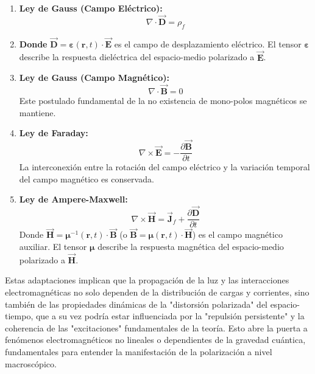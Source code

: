 \documentclass{book}
\newcommand{\bvec}[1]{\vec{\mathbf{#1}}}
\begin{document}
\begin{enumerate}
    \item \textbf{Ley de Gauss (Campo Eléctrico):}
    \begin{equation}
       \nabla \cdot \bvec{D} = \rho_f
        \label{eq:maxwell_gauss_E}
    \end{equation}
    \item \textbf{Donde} $\bvec{D} = \boldsymbol{\varepsilon}(\mathbf{r}, t) \cdot \bvec{E}$ es el campo de desplazamiento eléctrico. El tensor $\boldsymbol{\varepsilon}$ describe la respuesta dieléctrica del espacio-medio polarizado a $\bvec{E}$.

    \item \textbf{Ley de Gauss (Campo Magnético):}
    \begin{equation}
        \nabla \cdot \bvec{B} = 0
        \label{eq:maxwell_gauss_B}
    \end{equation}
    Este postulado fundamental de la no existencia de mono-polos magnéticos se mantiene.

    \item \textbf{Ley de Faraday:}
    \begin{equation}
        \nabla \times \bvec{E} = - \frac{\partial \bvec{B}}{\partial t}
        \label{eq:maxwell_faraday}
    \end{equation}
    La interconexión entre la rotación del campo eléctrico y la variación temporal del campo magnético es conservada.

    \item \textbf{Ley de Ampere-Maxwell:}
    \begin{equation}
        \nabla \times \bvec{H} = \bvec{J}_f + \frac{\partial \bvec{D}}{\partial t}
        \label{eq:maxwell_ampere}
    \end{equation}
    Donde $\bvec{H} = \boldsymbol{\mu}^{-1}(\mathbf{r}, t) \cdot \bvec{B}$ (o $\bvec{B} = \boldsymbol{\mu}(\mathbf{r}, t) \cdot \bvec{H}$) es el campo magnético auxiliar. El tensor $\boldsymbol{\mu}$ describe la respuesta magnética del espacio-medio polarizado a $\bvec{H}$.
\end{enumerate}

Estas adaptaciones implican que la propagación de la luz y las interacciones electromagnéticas no solo dependen de la distribución de cargas y corrientes, sino también de las propiedades dinámicas de la "distorsión polarizada" del espacio-tiempo, que a su vez podría estar influenciada por la "repulsión persistente" y la coherencia de las "excitaciones" fundamentales de la teoría. Esto abre la puerta a fenómenos electromagnéticos no lineales o dependientes de la gravedad cuántica, fundamentales para entender la manifestación de la polarización a nivel macroscópico.
\end{document}
